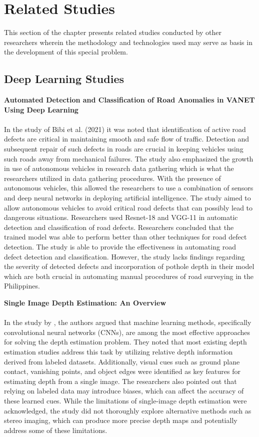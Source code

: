 \section{Related Studies}
This section of the chapter presents related studies conducted by other researchers wherein the methodology and technologies used may serve as basis in the development of this special problem.

\subsection{Deep Learning Studies}

\noindent\textbf{\large Automated Detection and Classification of Road Anomalies in VANET Using Deep Learning} \\\\
In the study of Bibi et al. (2021) it was noted that identification of active road defects are critical in maintaining smooth and safe flow of traffic. Detection and subsequent repair of such defects in roads are crucial in keeping vehicles using such roads away from mechanical failures. The study also emphasized the growth in use of autonomous vehicles in research data gathering which is what the researchers utilized in data gathering procedures. With the presence of autonomous vehicles, this allowed the researchers to use a combination of sensors and deep neural networks in deploying artificial intelligence. The study aimed to allow autonomous vehicles to avoid critical road defects that can possibly lead to dangerous situations. Researchers used Resnet-18 and VGG-11 in automatic detection and classification of road defects. Researchers concluded that the trained model was able to perform better than other techniques for road defect detection. The study is able to provide the effectiveness in automating road defect detection and classification. However, the study lacks findings regarding the severity of detected defects and incorporation of pothole depth in their model which are both crucial in automating manual procedures of road surveying in the Philippines.

\noindent\textbf{\large Single Image Depth Estimation: An Overview} \\\\
In the study by , the authors argued that machine learning methods, specifically convolutional neural networks (CNNs), are among the most effective approaches for solving the depth estimation problem. They noted that most existing depth estimation studies address this task by utilizing relative depth information derived from labeled datasets. Additionally, visual cues such as ground plane contact, vanishing points, and object edges were identified as key features for estimating depth from a single image.
The researchers also pointed out that relying on labeled data may introduce biases, which can affect the accuracy of these learned cues. While the limitations of single-image depth estimation were acknowledged, the study did not thoroughly explore alternative methods such as stereo imaging, which can produce more precise depth maps and potentially address some of these limitations.

